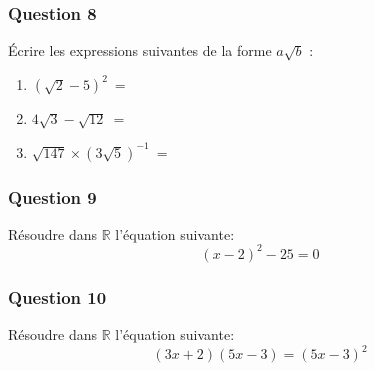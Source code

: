 \documentclass[t,12pt]{beamer}
\newcommand{\R}{\mathbb{R}}
\begin{document}
\begin{frame}
	\frametitle{Question 8}
	Écrire les expressions suivantes de la forme $a\sqrt{b}$ :\bigskip
	\begin{enumerate}
		\item $(\sqrt{2}-5)^2 \ = \ $\bigskip
		\item $4\sqrt{3}-\sqrt{12} \ = \ $ \bigskip
		\item $\sqrt{147} \times (3\sqrt{5})^{-1} \ = \ $
	\end{enumerate}
\end{frame}

\begin{frame}
	\frametitle{Question 9}
	Résoudre dans $\R$ l'équation suivante: 
	$$(x-2)^2-25 = 0$$
\end{frame}

\begin{frame}
	\frametitle{Question 10}
	Résoudre dans $\R$ l'équation suivante: 
	$$(3x+2)(5x-3) = (5x-3)^2 $$
\end{frame}
\end{document}
